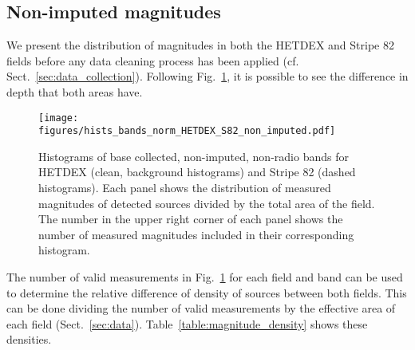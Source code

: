\documentclass{aa}
\begin{document}
\begin{appendix}
\section{Non-imputed magnitudes}\label{sec:app_nonimputed_mag_dist}

We present the distribution of magnitudes in both the HETDEX and Stripe 82 fields before any data cleaning process has been applied (cf. Sect.~\ref{sec:data_collection}). Following Fig.~\ref{fig:hists_bands_nonimp_HETDEX_S82}, it is possible to see the difference in depth that both areas have.

\begin{figure}
   \centering
   \texttt{[image: figures/hists\_bands\_norm\_HETDEX\_S82\_non\_imputed.pdf]}
   \caption{Histograms of base collected, non-imputed, non-radio bands for HETDEX (clean, background histograms) and Stripe 82 (dashed histograms). Each panel shows the distribution of measured magnitudes of detected sources divided by the total area of the field. The number in the upper right corner of each panel shows the number of measured magnitudes included in their corresponding histogram.}
   \label{fig:hists_bands_nonimp_HETDEX_S82}
\end{figure}

The number of valid measurements in Fig.~\ref{fig:hists_bands_nonimp_HETDEX_S82} for each field and band can be used to determine the relative difference of density of sources between both fields. This can be done dividing the number of valid measurements by the effective area of each field (Sect.~\ref{sec:data}). Table~\ref{table:magnitude_density} shows these densities.


\end{appendix}
\end{document}
